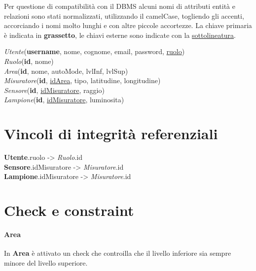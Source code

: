 Per questione di compatibilità con il DBMS alcuni nomi di attributi entità e relazioni sono stati normalizzati, utilizzando il camelCase, togliendo gli accenti, accorciando i nomi molto lunghi e con altre piccole accortezze.
La chiave primaria è indicata in \textbf{grassetto}, le chiavi esterne sono indicate con la \underline{sottolineatura}.

\textit{Utente}(\textbf{username}, nome, cognome, email, password, \underline{ruolo}) \\
\textit{Ruolo}(\textbf{id}, nome) \\
\textit{Area}(\textbf{id}, nome, autoMode, lvlInf, lvlSup) \\
\textit{Misuratore}(\textbf{id}, \underline{idArea}, tipo, latitudine, longitudine) \\
\textit{Sensore}(\textbf{id}, \underline{idMisuratore}, raggio) \\
\textit{Lampione}(\textbf{id}, \underline{idMisuratore}, luminosita)

\section{Vincoli di integrità referenziali}

\textbf{Utente}.ruolo -> \textit{Ruolo}.id \\
\textbf{Sensore}.idMisuratore -> \textit{Misuratore}.id \\
\textbf{Lampione}.idMisuratore -> \textit{Misuratore}.id

\section{Check e constraint}

\paragraph{Area} In \textbf{Area} è attivato un check che controilla che il livello inferiore sia sempre minore del livello superiore.